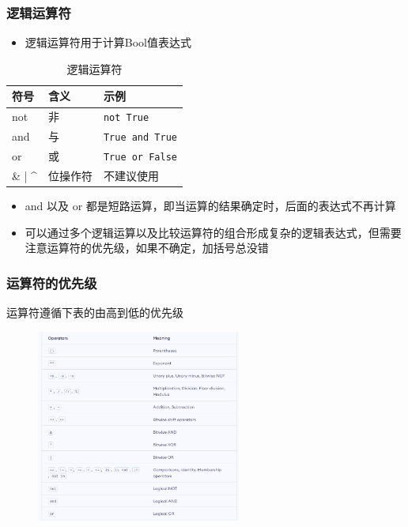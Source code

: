 \documentclass[10pt]{beamer}
\begin{document}
\begin{frame}
    \frametitle{逻辑运算符}

    \begin{itemize}
        \item 逻辑运算符用于计算Bool值表达式
    \end{itemize}
    \begin{table}
        \caption{逻辑运算符}
        \begin{tabular}{lll} \toprule
            符号 & 含义 & 示例 \\ \midrule
            not & 非 & \texttt{not True} \\
            and & 与 & \texttt{True and True} \\
            or & 或 & \texttt{True or False} \\ 
            \& | \textasciicircum & 位操作符 & 不建议使用 \\ 
            \bottomrule
    \end{tabular}
    \end{table}

    \begin{itemize}
        \item and 以及 or 都是短路运算，即当运算的结果确定时，后面的表达式不再计算
        \item 可以通过多个逻辑运算以及比较运算符的组合形成复杂的逻辑表达式，但需要注意运算符的优先级，如果不确定，加括号总没错
    \end{itemize}

\end{frame}

\begin{frame}
    \frametitle{运算符的优先级}

    运算符遵循下表的由高到低的优先级
    \begin{figure}
    \centering
    \includegraphics[width=0.6\textwidth]{figures/python_operator.jpg}
    \end{figure}

\end{frame}
\end{document}
